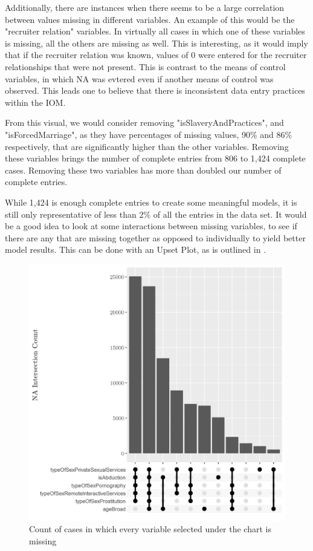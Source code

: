 \documentclass{article} %
\begin{document}
Additionally, there are instances when there seems to be a large correlation between values missing in different variables. An example of this would be the "recruiter relation" variables. In virtually all cases in which one of these variables is missing, all the others are missing as well. This is interesting, as it would imply that if the recruiter relation was known, values of 0 were entered for the recruiter relationships that were not present. This is contrast to the means of control variables, in which NA was evtered even if another means of control was observed. This leads one to believe that there is inconsistent data entry practices within the IOM.

From this visual, we would consider removing "isSlaveryAndPractices", and "isForcedMarriage", as they have percentages of missing values, 90\% and 86\% respectively, that are significantly higher than the other variables. Removing these variables brings the number of complete entries from 806 to 1,424 complete cases. Removing these two variables has more than doubled our number of complete entries.

While 1,424 is enough complete entries to create some meaningful models, it is still only representative of less than 2\% of all the entries in the data set. It would be a good idea to look at some interactions between missing variables, to see if there are any that are missing together as opposed to individually to yield better model results. This can be done with an Upset Plot, as is outlined in \cite{UpsetPlot}.

\begin{figure}[H]
	\includegraphics[width = \textwidth]{UpsetPlt1}
	\caption{Count of cases in which every variable selected under the chart is missing}
\end{figure}
\end{document}

